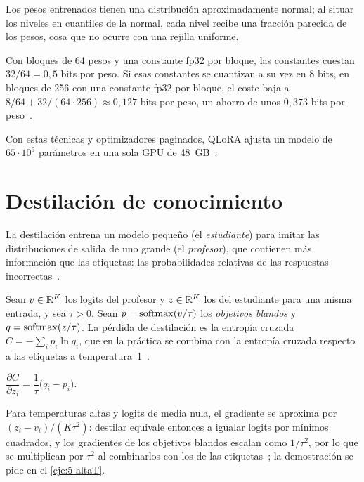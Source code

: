 Los pesos entrenados tienen una distribución aproximadamente normal; al situar los niveles en cuantiles de la normal, cada nivel recibe una fracción parecida de los pesos, cosa que no ocurre con una rejilla uniforme.

\begin{proposicion}\label{prop:doble}
Con bloques de 64 pesos y una constante fp32 por bloque, las constantes cuestan $32/64=0{,}5$ bits por peso. Si esas constantes se cuantizan a su vez en 8 bits, en bloques de 256 con una constante fp32 por bloque, el coste baja a $8/64+32/(64\cdot 256)\approx 0{,}127$ bits por peso, un ahorro de unos $0{,}373$ bits por peso~\cite[§3]{qlora}.
\end{proposicion}

Con estas técnicas y optimizadores paginados, QLoRA ajusta un modelo de $65\cdot 10^{9}$ parámetros en una sola GPU de 48~GB~\cite{qlora}.

\section{Destilación de conocimiento}

La destilación entrena un modelo pequeño (el \emph{estudiante}) para imitar las distribuciones de salida de uno grande (el \emph{profesor}), que contienen más información que las etiquetas: las probabilidades relativas de las respuestas incorrectas~\cite[§2]{hinton}.

\begin{definicion}\label{def:destilacion}
Sean $v\in\mathbb{R}^{K}$ los logits del profesor y $z\in\mathbb{R}^{K}$ los del estudiante para una misma entrada, y sea $\tau>0$. Sean $p=\operatorname{softmax}(v/\tau)$ los \emph{objetivos blandos} y $q=\operatorname{softmax}(z/\tau)$. La pérdida de destilación es la entropía cruzada $C=-\sum_{i}p_i\ln q_i$, que en la práctica se combina con la entropía cruzada respecto a las etiquetas a temperatura~1~\cite[§2, ec.~1]{hinton}.
\end{definicion}

\begin{proposicion}\label{prop:grad-destilacion}
$\dfrac{\partial C}{\partial z_i}=\dfrac{1}{\tau}\bigl(q_i-p_i\bigr)$.
\end{proposicion}

Para temperaturas altas y logits de media nula, el gradiente se aproxima por $(z_i-v_i)/(K\tau^{2})$: destilar equivale entonces a igualar logits por mínimos cuadrados, y los gradientes de los objetivos blandos escalan como $1/\tau^{2}$, por lo que se multiplican por $\tau^{2}$ al combinarlos con los de las etiquetas~\cite[§2.1]{hinton}; la demostración se pide en el \cref{eje:5-altaT}.

